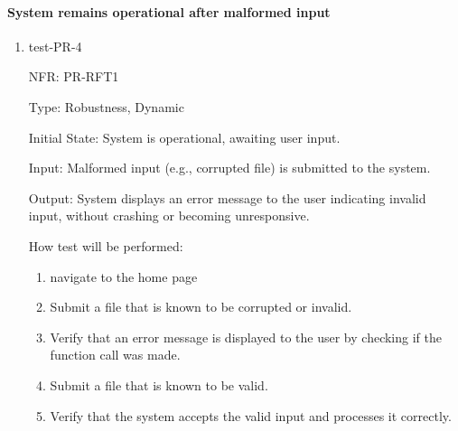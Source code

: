 \documentclass[12pt, titlepage]{article}
\begin{document}
\paragraph{System remains operational after malformed input}
\begin{enumerate}
  \item{test-PR-4}

  NFR: PR-RFT1

  Type: Robustness, Dynamic
            
  Initial State: System is operational, awaiting user input.
            
  Input:  Malformed input (e.g., corrupted file) is submitted to the system.
            
  Output: System displays an error message to the user indicating invalid input, without crashing or becoming unresponsive.
            
  How test will be performed: 
  \begin{enumerate}
    \item navigate to the home page
    \item Submit a file that is known to be corrupted or invalid.
    \item Verify that an error message is displayed to the user by checking if the function call was made.
    \item Submit a file that is known to be valid.
    \item Verify that the system accepts the valid input and processes it correctly.
  \end{enumerate}
\end{enumerate}
\end{document}
